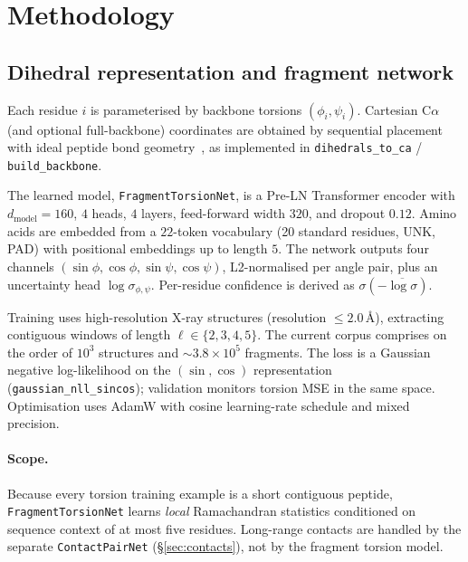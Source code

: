 \documentclass[11pt,a4paper]{article}
\begin{document}
\section{Methodology}

\subsection{Dihedral representation and fragment network}
\label{sec:network}

Each residue $i$ is parameterised by backbone torsions $(\phi_i,\psi_i)$.
Cartesian C$\alpha$ (and optional full-backbone) coordinates are obtained by sequential placement with ideal peptide bond geometry~\citep{engh1991accurate}, as implemented in \texttt{dihedrals\_to\_ca} / \texttt{build\_backbone}.

The learned model, \texttt{FragmentTorsionNet}, is a Pre-LN Transformer encoder with
$d_{\mathrm{model}}{=}160$, $4$ heads, $4$ layers, feed-forward width $320$, and dropout $0.12$.
Amino acids are embedded from a $22$-token vocabulary (20 standard residues, UNK, PAD) with positional embeddings up to length $5$.
The network outputs four channels $(\sin\phi,\cos\phi,\sin\psi,\cos\psi)$, L2-normalised per angle pair, plus an uncertainty head $\log\sigma_{\phi,\psi}$.
Per-residue confidence is derived as $\sigma(-\overline{\log\sigma})$.

Training uses high-resolution X-ray structures (resolution $\le 2.0$\,\AA), extracting contiguous windows of length $\ell\in\{2,3,4,5\}$.
The current corpus comprises on the order of $10^{3}$ structures and $\sim 3.8{\times}10^{5}$ fragments.
The loss is a Gaussian negative log-likelihood on the $(\sin,\cos)$ representation (\texttt{gaussian\_nll\_sincos}); validation monitors torsion MSE in the same space.
Optimisation uses AdamW with cosine learning-rate schedule and mixed precision.

\paragraph{Scope.}
Because every torsion training example is a short contiguous peptide, \texttt{FragmentTorsionNet} learns \emph{local} Ramachandran statistics conditioned on sequence context of at most five residues.
Long-range contacts are handled by the separate \texttt{ContactPairNet} (\S\ref{sec:contacts}), not by the fragment torsion model.
\end{document}
